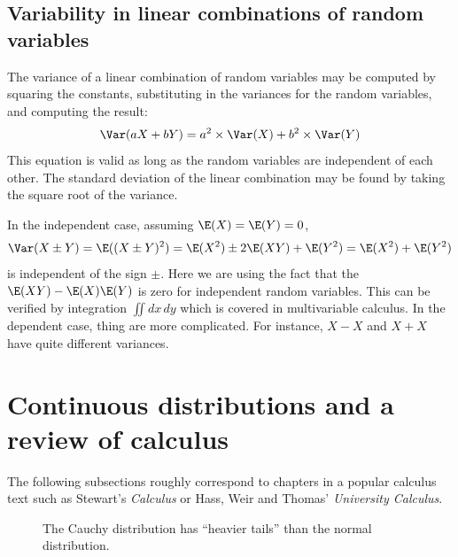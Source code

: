 \subsection{Variability in linear combinations of random variables}

	\begin{termBox}{
	The variance of a linear combination of random variables may be computed by squaring the constants,
	substituting in the variances for the random variables, and computing the result:
	\begin{align*}
		\Var(aX + bY) = a^2\times \Var(X) + b^2\times \Var(Y)
	\end{align*}
	This equation is valid as long as the random variables are independent of each other.
	The standard deviation of the linear combination may be found by taking the square root of the variance.}
	\end{termBox}

	In the independent case, assuming $\E(X)=\E(Y)=0$,
	\[
		\Var(X\pm Y) = \E((X\pm Y)^2) = \E(X^2) \pm 2 \E(XY) + \E(Y^2) = \E(X^2)+\E(Y^2)
	\]
	is independent of the sign $\pm$.
	Here we are using the fact that the  $\E(XY)-\E(X)\E(Y)$ is zero for independent random variables.
	This can be verified by integration $\iint dx\,dy$ which is covered in multivariable calculus.
	In the dependent case, thing are more complicated. For instance, $X-X$ and $X+X$ have quite different variances.

\section{Continuous distributions and a review of calculus}
\label{contDist}

The following subsections roughly correspond to chapters in a popular calculus text such as Stewart's \emph{Calculus} or Hass, Weir and Thomas' \emph{University Calculus}.

\begin{figure}
\caption{The Cauchy distribution has ``heavier tails'' than the normal distribution.}
\end{figure}

